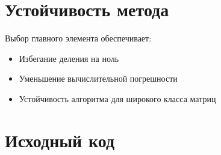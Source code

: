 \section*{Устойчивость метода}

Выбор главного элемента обеспечивает:
\begin{itemize}
\item Избегание деления на ноль
\item Уменьшение вычислительной погрешности
\item Устойчивость алгоритма для широкого класса матриц
\end{itemize}

\section*{Исходный код}

